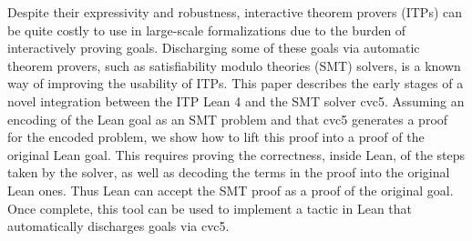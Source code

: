 Despite their expressivity and robustness, interactive theorem pro\-vers (ITPs)
can be quite costly to use in large-scale formalizations due to the burden of
interactively proving goals.
%
Discharging some of these goals via automatic theorem provers, such as
satisfiability modulo theories (SMT) solvers, is a known way of improving the
usability of ITPs.
%
This paper describes the early stages of a novel integration between the ITP
Lean 4 and the SMT solver cvc5.
%
Assuming an encoding of the Lean goal as an SMT problem and that cvc5
generates a proof for the encoded problem, we show how to lift this proof into
a proof of the original Lean goal.
%
This requires proving the correctness, inside Lean, of the steps taken by the
solver, as well as decoding the terms in the proof into the original Lean
ones. Thus Lean can accept the SMT proof as a proof of the original goal.
%
Once complete, this tool can be used to implement a tactic in Lean that
automatically discharges goals via cvc5.
